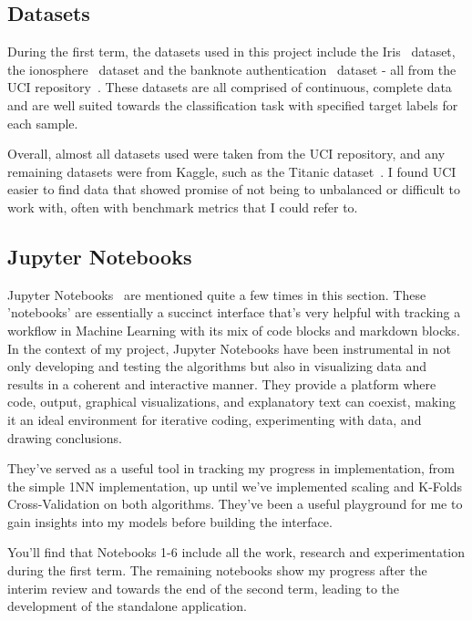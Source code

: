 \documentclass[letterpaper,10pt]{article}
\begin{document}
\subsection{Datasets}
During the first term, the datasets used in this project include the Iris~\cite{irisdata} dataset, the ionosphere~\cite{ionosphere} dataset and the banknote authentication~\cite{banknote_authentication} dataset - all from the UCI repository~\cite{uci}. These datasets are all comprised of continuous, complete data and are well suited towards the classification task with specified target labels for each sample. \par
Overall, almost all datasets used were taken from the UCI repository, and any remaining datasets were from Kaggle, such as the Titanic dataset~\cite{titanic}. I found UCI easier to find data that showed promise of not being to unbalanced or difficult to work with, often with benchmark metrics that I could refer to. \par

\subsection{Jupyter Notebooks}
Jupyter Notebooks~\cite{jupyter} are mentioned quite a few times in this section. These 'notebooks' are essentially a succinct interface that's very helpful with tracking a workflow in Machine Learning with its mix of code blocks and markdown blocks. In the context of my project, Jupyter Notebooks have been instrumental in not only developing and testing the algorithms but also in visualizing data and results in a coherent and interactive manner. They provide a platform where code, output, graphical visualizations, and explanatory text can coexist, making it an ideal environment for iterative coding, experimenting with data, and drawing conclusions. \par
They've served as a useful tool in tracking my progress in implementation, from the simple 1NN implementation, up until we've implemented scaling and K-Folds Cross-Validation on both algorithms. They've been a useful playground for me to gain insights into my models before building the interface. \par
You'll find that Notebooks 1-6 include all the work, research and experimentation during the first term. The remaining notebooks show my progress after the interim review and towards the end of the second term, leading to the development of the standalone application. \par
\end{document}
